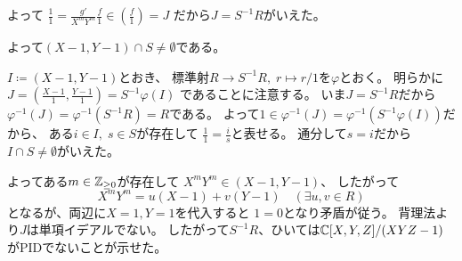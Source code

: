 \documentclass[report]{jlreq}
\begin{document}
\begin{answer}
\begin{innerproof}
        よって
        $\frac{1}{1}
            = \frac{g'}{X^m Y^m} \frac{f}{1}
            \in \left(\frac{f}{1}\right) = J$
        だから$J = S^{-1}R$がいえた。
    \end{innerproof}
    よって$(X - 1, Y - 1) \cap S \neq \emptyset$である。
    \begin{innerproof}
        $I \coloneqq (X - 1, Y - 1)$とおき、
        標準射$R \to S^{-1}R, \; r \mapsto r / 1$を$\varphi$とおく。
        明らかに$J = \left(\frac{X - 1}{1}, \frac{Y - 1}{1}\right)
            = S^{-1} \varphi(I)$
        であることに注意する。
        いま$J = S^{-1}R$だから$\varphi^{-1}(J) = \varphi^{-1}(S^{-1}R) = R$である。
        よって$1 \in \varphi^{-1}(J) = \varphi^{-1}(S^{-1} \varphi(I))$だから、
        ある$i \in I, \; s \in S$が存在して
        $\frac{1}{1} = \frac{i}{s}$と表せる。
        通分して$s = i$だから$I \cap S \neq \emptyset$がいえた。
    \end{innerproof}
    よってある$m \in \mathbb{Z}_{\ge 0}$が存在して
    $X^m Y^m \in (X - 1, Y - 1)$、
    したがって
    \begin{equation}
        X^m Y^m = u (X - 1) + v (Y - 1)
            \quad
            (\exists u, v \in R)
    \end{equation}
    となるが、両辺に$X = 1, Y = 1$を代入すると
    $1 = 0$となり矛盾が従う。
    背理法より$J$は単項イデアルでない。
    したがって$S^{-1}R$、ひいては$\mathbb{C}[X, Y, Z] / (XYZ - 1)$がPIDでないことが示せた。
\end{answer}
\end{document}
